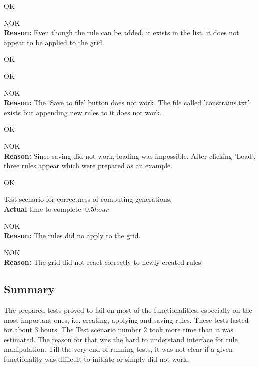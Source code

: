 \documentclass{article}
\begin{document}
\begin{legal}
\begin{legal}
		\item {\color{green}OK}
		
		\item {\color{red}NOK}
		\\{\bf Reason:} Even though the rule can be added, it exists in the list, it does not appear to be applied to the grid.

		\item {\color{green}OK}
				
		\item {\color{green}OK}
		
		\item {\color{red}NOK}
		\\{\bf Reason:} The 'Save to file' button does not work. The file called 'constrains.txt' exists but appending new rules to it does not work.

		\item {\color{green}OK}
		
		\item {\color{red}NOK}
		\\{\bf Reason:} Since saving did not work, loading was impossible. After clicking 'Load', three rules appear which were prepared as an example.
		
		\item {\color{green}OK}

	\end{legal}
	
	
	\item Test scenario for correctness of computing generations.
	\\ {\bf Actual} time to complete: $0.5 hour$
	\begin{legal}
		\item {\color{red}NOK}
		\\{\bf Reason:} The rules did no apply to the grid.		
		
		\item {\color{red}NOK}
		\\{\bf Reason:} The grid did not react correctly to newly created rules.

	\end{legal}

\end{legal}
\subsection{Summary}
The prepared tests proved to fail on most of the functionalities, especially on the most important ones, i.e. 
creating, applying and saving rules. These tests lasted for about 3 hours. The Test scenario number $2$ took more time than it was estimated. The reason for that was the hard to understand interface for rule manipulation. Till the very end of running tests, it was not clear if a given functionality was difficult to initiate or simply did not work.
\end{document}
